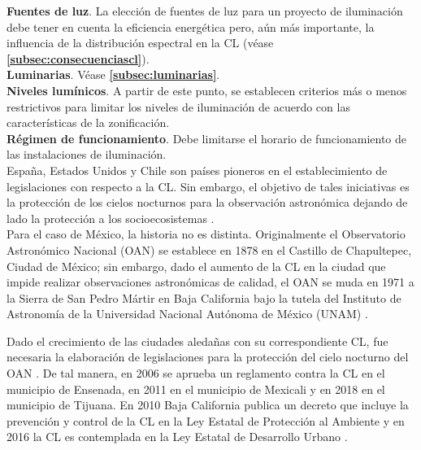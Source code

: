 \textbf{Fuentes de luz}.
La elección de fuentes de luz para un proyecto de iluminación debe tener en cuenta la eficiencia energética pero, aún más importante, la influencia de la distribución espectral en la CL (véase \textbf{\autoref{subsec:consecuenciascl}}).\\


\textbf{Luminarias}.
Véase \textbf{\autoref{subsec:luminarias}}.\\


\textbf{Niveles lumínicos}.
A partir de este punto, se establecen criterios más o menos restrictivos para limitar los niveles de iluminación de acuerdo con las características de la zonificación.\\


\textbf{Régimen de funcionamiento}.
Debe limitarse el horario de funcionamiento de las instalaciones de iluminación.\\


España, Estados Unidos y Chile son países pioneros en el establecimiento de legislaciones con respecto a la CL. Sin embargo, el objetivo de tales iniciativas es la protección de los cielos nocturnos para la observación astronómica dejando de lado la protección a los socioecosistemas \citep{LibroCL}.\\

Para el caso de México, la historia no es distinta. Originalmente el Observatorio Astronómico Nacional (OAN) se establece en 1878 en el Castillo de Chapultepec, Ciudad de México; sin embargo, dado el aumento de la CL en la ciudad que impide realizar observaciones astronómicas de calidad, el OAN se muda en 1971 a la Sierra de San Pedro Mártir en Baja California bajo la tutela del Instituto de Astronomía de la Universidad Nacional Autónoma de México (UNAM) \citep{UNESCO2016}.\\

\newpage

Dado el crecimiento de las ciudades aledañas con su correspondiente CL, fue necesaria la elaboración de legislaciones para la protección del cielo nocturno del OAN \citep{UNESCO2016}. De tal manera, en 2006 se aprueba un reglamento contra la CL en el municipio de Ensenada, en 2011 en el municipio de Mexicali y en 2018 en el municipio de Tijuana. En 2010 Baja California publica un decreto que incluye la prevención y control de la CL en la Ley Estatal de Protección al Ambiente y en 2016 la CL es contemplada en la Ley Estatal de Desarrollo Urbano \citep{UNESCO2016}.\\

